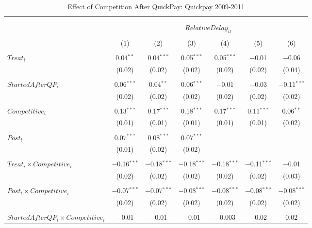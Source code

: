 \documentclass[]{article}
\begin{document}
\begin{table}[H] \centering 
  \caption{Effect of Competition After QuickPay: Quickpay 2009-2011} 
  \label{} 
\small 
\begin{tabular}{@{\extracolsep{-3pt}}lcccccc} 
\\[-1.8ex]\hline 
\hline \\[-1.8ex] 
\\[-1.8ex] & \multicolumn{6}{c}{$RelativeDelay_{it}$  } \\ 
\\[-1.8ex] & (1) & (2) & (3) & (4) & (5) & (6)\\ 
\hline \\[-1.8ex] 
 $Treat_i$ & 0.04$^{**}$ & 0.04$^{***}$ & 0.05$^{***}$ & 0.05$^{***}$ & $-$0.01 & $-$0.06 \\ 
  & (0.02) & (0.02) & (0.02) & (0.02) & (0.02) & (0.04) \\ 
  & & & & & & \\ 
 $StartedAfterQP_i$ & 0.06$^{***}$ & 0.04$^{**}$ & 0.06$^{***}$ & $-$0.01 & $-$0.03 & $-$0.11$^{***}$ \\ 
  & (0.02) & (0.02) & (0.02) & (0.02) & (0.02) & (0.02) \\ 
  & & & & & & \\ 
 $Competitive_i$ & 0.13$^{***}$ & 0.17$^{***}$ & 0.18$^{***}$ & 0.17$^{***}$ & 0.11$^{***}$ & 0.06$^{**}$ \\ 
  & (0.01) & (0.01) & (0.01) & (0.01) & (0.01) & (0.02) \\ 
  & & & & & & \\ 
 $Post_t$ & 0.07$^{***}$ & 0.08$^{***}$ & 0.07$^{***}$ &  &  &  \\ 
  & (0.01) & (0.02) & (0.02) &  &  &  \\ 
  & & & & & & \\ 
 $Treat_i \times Competitive_i$ & $-$0.16$^{***}$ & $-$0.18$^{***}$ & $-$0.18$^{***}$ & $-$0.18$^{***}$ & $-$0.11$^{***}$ & $-$0.01 \\ 
  & (0.02) & (0.02) & (0.02) & (0.02) & (0.02) & (0.03) \\ 
  & & & & & & \\ 
 $Post_t \times Competitive_i$ & $-$0.07$^{***}$ & $-$0.07$^{***}$ & $-$0.08$^{***}$ & $-$0.08$^{***}$ & $-$0.08$^{***}$ & $-$0.08$^{***}$ \\ 
  & (0.02) & (0.02) & (0.02) & (0.02) & (0.02) & (0.02) \\ 
  & & & & & & \\ 
 $StartedAfterQP_i \times Competitive_i$ & $-$0.01 & $-$0.01 & $-$0.01 & $-$0.003 & $-$0.02 & 0.02 \\ 

\end{tabular}
\end{table}
\end{document}
